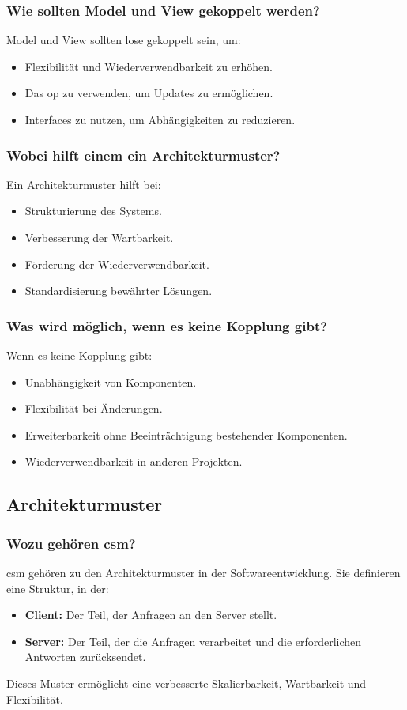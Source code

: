 \documentclass[main.tex]{subfiles}
\begin{document}
\subsubsection*{Wie sollten Model und View gekoppelt werden?}
Model und View sollten lose gekoppelt sein, um:
\begin{itemize}
    \item Flexibilität und Wiederverwendbarkeit zu erhöhen.
    \item Das \gls{op} zu verwenden, um Updates zu ermöglichen.
    \item \glspl{Interface} zu nutzen, um Abhängigkeiten zu reduzieren.
\end{itemize}


\subsubsection*{Wobei hilft einem ein \gls{Architekturmuster}?}Ein \gls{Architekturmuster} hilft bei:
\begin{itemize}
    \item Strukturierung des Systems.
    \item Verbesserung der Wartbarkeit.
    \item Förderung der Wiederverwendbarkeit.
    \item Standardisierung bewährter Lösungen.
\end{itemize}

\subsubsection*{Was wird möglich, wenn es keine \gls{Kopplung} gibt?}
Wenn es keine \gls{Kopplung} gibt:
\begin{itemize}
    \item Unabhängigkeit von Komponenten.
    \item Flexibilität bei Änderungen.
    \item Erweiterbarkeit ohne Beeinträchtigung bestehender Komponenten.
    \item Wiederverwendbarkeit in anderen Projekten.
\end{itemize}



\subsection{\gls{Architekturmuster}}
\subsubsection*{Wozu gehören \gls{csm}?}
\gls{csm} gehören zu den \gls{Architekturmuster} in der Softwareentwicklung. Sie definieren eine Struktur, in der:
\begin{itemize}
    \item \textbf{Client:} Der Teil, der Anfragen an den Server stellt.
    \item \textbf{Server:} Der Teil, der die Anfragen verarbeitet und die erforderlichen Antworten zurücksendet.
\end{itemize}
Dieses Muster ermöglicht eine verbesserte Skalierbarkeit, Wartbarkeit und Flexibilität.
\end{document}
